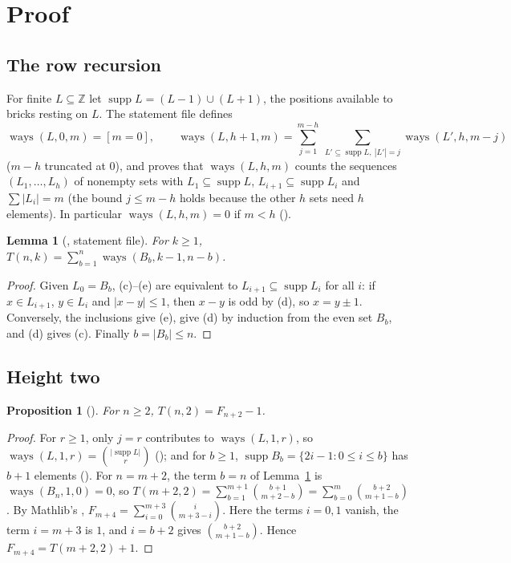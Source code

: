 \documentclass[11pt]{amsart}
\theoremstyle{plain}
\newtheorem{lemma}[theorem]{Lemma}
\newtheorem{proposition}[theorem]{Proposition}
\theoremstyle{definition}
\newcommand{\Z}{\mathbb{Z}}
\newcommand{\supp}{\operatorname{supp}}
\newcommand{\ways}{\operatorname{ways}}
\begin{document}
\section{Proof}\label{sec:proof}

\subsection{The row recursion}\label{sec:rec}
For finite $L\subseteq\Z$ let $\supp L=(L-1)\cup(L+1)$, the positions available to bricks resting on $L$. The statement file defines
\[
\ways(L,0,m)=[m=0],\qquad \ways(L,h+1,m)=\sum_{j=1}^{m-h}\ \sum_{L'\subseteq\supp L,\ |L'|=j}\ways(L',h,m-j)
\]
($m-h$ truncated at $0$), and proves that $\ways(L,h,m)$ counts the sequences $(L_1,\dots,L_h)$ of nonempty sets with $L_1\subseteq\supp L$, $L_{i+1}\subseteq\supp L_i$ and $\sum|L_i|=m$ (the bound $j\le m-h$ holds because the other $h$ sets need $h$ elements). In particular $\ways(L,h,m)=0$ if $m<h$ ().

\begin{lemma}[, statement file]\label{lem:Tc}
For $k\ge1$, $T(n,k)=\sum_{b=1}^{n}\ways(B_b,k-1,n-b)$.
\end{lemma}
\begin{proof}
Given $L_0=B_b$, (c)--(e) are equivalent to $L_{i+1}\subseteq\supp L_i$ for all $i$: if $x\in L_{i+1}$, $y\in L_i$ and $|x-y|\le1$, then $x-y$ is odd by (d), so $x=y\pm1$. Conversely, the inclusions give (e), give (d) by induction from the even set $B_b$, and (d) gives (c). Finally $b=|B_b|\le n$.
\end{proof}

\subsection{Height two}
\begin{proposition}[]\label{prop:col2}
For $n\ge2$, $T(n,2)=F_{n+2}-1$.
\end{proposition}
\begin{proof}
For $r\ge1$, only $j=r$ contributes to $\ways(L,1,r)$, so $\ways(L,1,r)=\binom{|\supp L|}{r}$ (); and for $b\ge1$, $\supp B_b=\{2i-1:0\le i\le b\}$ has $b+1$ elements (). For $n=m+2$, the term $b=n$ of Lemma~\ref{lem:Tc} is $\ways(B_n,1,0)=0$, so
$T(m+2,2)=\sum_{b=1}^{m+1}\binom{b+1}{m+2-b}=\sum_{b=0}^{m}\binom{b+2}{m+1-b}$.
By Mathlib's , $F_{m+4}=\sum_{i=0}^{m+3}\binom{i}{m+3-i}$. Here the terms $i=0,1$ vanish, the term $i=m+3$ is $1$, and $i=b+2$ gives $\binom{b+2}{m+1-b}$. Hence $F_{m+4}=T(m+2,2)+1$.
\end{proof}
\end{document}
